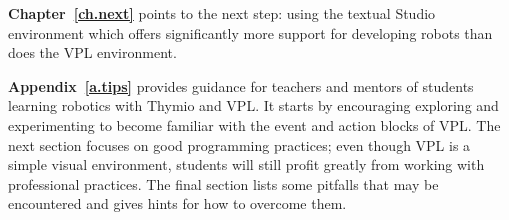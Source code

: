 \textbf{Chapter~\ref{ch.next}} points to the next step: using
the textual Studio environment which offers significantly more support for
developing robots than does the VPL environment.

\textbf{Appendix~\ref{a.tips}} provides guidance for teachers and mentors
of students learning robotics with Thymio and VPL.
It starts by encouraging exploring and experimenting
to become familiar with the event and action blocks of VPL.
The next section focuses on good programming practices;
even though VPL is a simple visual environment,
students will still profit greatly from working with
professional practices.
The final section lists some pitfalls that may be encountered
and gives hints for how to overcome them.
